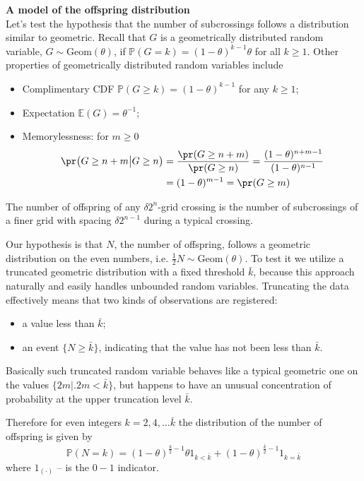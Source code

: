 \noindent \textbf{A model of the offspring distribution} \hfill \\

Let's test the hypothesis that the number of subcrossings follows a distribution
similar to geometric. Recall that $G$ is a geometrically distributed random variable,
$G\sim \text{Geom}(\theta)$, if $\mathbb{P}(G=k) = {(1-\theta)}^{k-1}\theta$ for all
$k\geq1$. Other properties of geometrically distributed random variables include
\begin{itemize}
	\item Complimentary CDF $\mathbb{P}(G\geq k) = (1-\theta)^{k-1}$ for any $k\geq1$;
	\item Expectation $\mathbb{E}(G) = \theta^{-1}$;
	\item Memorylessness: for $m\geq 0$
	\begin{align*}
		\pr\bigl( G \geq n + m \bigr\rvert\bigl. G \geq n \bigr)
		&= \frac{\pr(G \geq n+m)}{\pr(G \geq n)} = \frac{(1-\theta)^{n+m-1}}{(1-\theta)^{n-1}} \\
		& = (1-\theta)^{m-1} = \pr(G \geq m)
	\end{align*}
\end{itemize}

The number of offspring of any $\delta 2^n$-grid crossing is the number of subcrossings
of a finer grid with spacing $\delta 2^{n-1}$ during a typical crossing.

Our hypothesis is that $N$, the number of offspring, follows a geometric distribution
on the even numbers, i.e. $\frac{1}{2}N \sim \text{Geom}(\theta)$. To test it we
utilize a truncated geometric distribution with a fixed threshold $\bar{k}$, because
this approach naturally and easily handles unbounded random variables. Truncating the
data effectively means that two kinds of observations are registered:
\begin{itemize}
	\item a value less than $\bar{k}$;
	\item an event $\big\{N\geq \bar{k}\big\}$, indicating that the value has not
	been less than $\bar{k}$.
\end{itemize}
Basically such truncated random variable behaves like a typical geometric one on
the values $\bigl\{ 2m \bigr\rvert \bigl. 2m < \bar{k}\bigr\}$, but happens to have
an unusual concentration of probability at the upper truncation level $\bar{k}$.

Therefore for even integers $k=2,4,\ldots\bar{k}$ the distribution of the number
of offspring is given by
\[
\mathbb{P}(N=k)
= (1-\theta)^{\frac{k}{2}-1} \theta 1_{k<\bar{k}}
+ (1-\theta)^{\frac{\bar{k}}{2}-1} 1_{k = \bar{k}}
\]
where $1_{(\cdot)}$ -- is the $0-1$ indicator.

